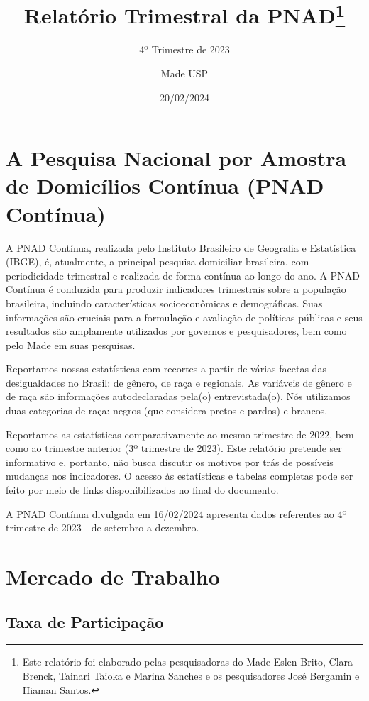 \documentclass[
]{article}
\title{Relatório Trimestral da PNAD\footnote{Este relatório foi
  elaborado pelas pesquisadoras do Made Eslen Brito, Clara Brenck,
  Tainari Taioka e Marina Sanches e os pesquisadores José Bergamin e
  Hiaman Santos.}}
\subtitle{4º Trimestre de 2023}
\author{Made USP}
\date{20/02/2024}
\begin{document}
\maketitle

\hypertarget{a-pesquisa-nacional-por-amostra-de-domicuxedlios-contuxednua-pnad-contuxednua}{%
\section{A Pesquisa Nacional por Amostra de Domicílios Contínua (PNAD
Contínua)}\label{a-pesquisa-nacional-por-amostra-de-domicuxedlios-contuxednua-pnad-contuxednua}}

A PNAD Contínua, realizada pelo Instituto Brasileiro de Geografia e
Estatística (IBGE), é, atualmente, a principal pesquisa domiciliar
brasileira, com periodicidade trimestral e realizada de forma contínua
ao longo do ano. A PNAD Contínua é conduzida para produzir indicadores
trimestrais sobre a população brasileira, incluindo características
socioeconômicas e demográficas. Suas informações são cruciais para a
formulação e avaliação de políticas públicas e seus resultados são
amplamente utilizados por governos e pesquisadores, bem como pelo Made
em suas pesquisas.

Reportamos nossas estatísticas com recortes a partir de várias facetas
das desigualdades no Brasil: de gênero, de raça e regionais. As
variáveis de gênero e de raça são informações autodeclaradas pela(o)
entrevistada(o). Nós utilizamos duas categorias de raça: negros (que
considera pretos e pardos) e brancos.

Reportamos as estatísticas comparativamente ao mesmo trimestre de 2022,
bem como ao trimestre anterior (3º trimestre de 2023). Este relatório
pretende ser informativo e, portanto, não busca discutir os motivos por
trás de possíveis mudanças nos indicadores. O acesso às estatísticas e
tabelas completas pode ser feito por meio de links disponibilizados no
final do documento.

A PNAD Contínua divulgada em 16/02/2024 apresenta dados referentes ao 4º
trimestre de 2023 - de setembro a dezembro.

\hypertarget{mercado-de-trabalho}{%
\section{Mercado de Trabalho}\label{mercado-de-trabalho}}

\hypertarget{taxa-de-participauxe7uxe3o}{%
\subsection{Taxa de Participação}\label{taxa-de-participauxe7uxe3o}}
\end{document}
